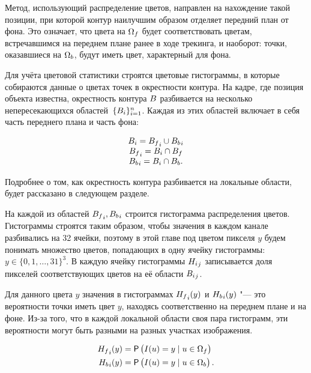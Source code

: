 Метод, использующий распределение цветов, направлен на нахождение такой
позиции, при которой контур наилучшим образом отделяет передний план от фона.
Это означает, что цвета на $\Omega_f$ будет соответствовать цветам,
встречавшимся на переднем плане ранее в ходе трекинга, и наоборот: точки,
оказавшиеся на $\Omega_b$, будут иметь цвет, характерный для фона.

Для учёта цветовой статистики строятся цветовые гистограммы, в которые
собираются данные о цветах точек в окрестности контура.
На кадре, где позиция объекта известна, окрестность контура $B$
разбивается на несколько
непересекающихся областей~$\{B_i\}_{i = 1}^n$.
Каждая из этих областей включает в себя часть переднего плана и часть фона:

\begin{equation}
\label{eqn:histo_partitioning}
\begin{array}{c}
B_i = {B_f}_i \cup {\ensuremath{B_b}}_i \\
{B_f}_i = B_i \cap B_f \\
{B_b}_i = B_i \cap B_b
\text{.}
\end{array}
\end{equation}

Подробнее о том, как окрестность контура разбивается на локальные области,
будет
рассказано в следующем разделе.

На каждой из областей ${B_f}_i, {B_b}_i$ строится
гистограмма распределения цветов.
Гистограммы строятся таким образом, чтобы значения в каждом канале разбивались
на 32 ячейки, поэтому в этой главе под цветом пикселя $y$ будем понимать
множество цветов, попадающих в одну ячейку гистограммы:
$y \in \{0, 1, \dots, 31\}^3$.
В каждую ячейку гистограммы ${H_i}_j$ записывается доля пикселей
соответствующих
цветов на её области ${B_i}_j$.

Для данного цвета $y$ значения в гистограммах ${H_f}_i(y)$ и
${H_b}_i(y)$ "--- это вероятности точки иметь цвет $y$, находясь
соответственно на переднем плане и на фоне.
Из-за того, что в каждой локальной области своя пара гистограмм, эти
вероятности могут быть разными на разных участках изображения.

\begin{align}
\label{eqn:H_f_Y}
    {\ensuremath{H_f}}_i(y) &= \mathsf{P} \left( I(\mathnormal{u}) = y \mid \mathnormal{u} \in \Omega_f \right) \\
    {H_b}_i(y) &= \mathsf{P} \left( I(\mathnormal{u}) = y \mid \mathnormal{u} \in \Omega_b \right)
\text{.}
\end{align}

